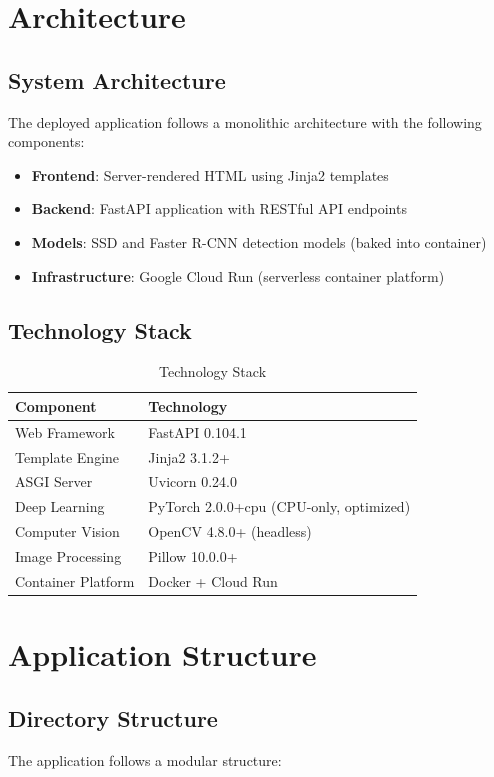 \documentclass[12pt,a4paper]{article}
\begin{document}
\section{Architecture}

\subsection{System Architecture}
The deployed application follows a monolithic architecture with the following components:

\begin{itemize}
    \item \textbf{Frontend}: Server-rendered HTML using Jinja2 templates
    \item \textbf{Backend}: FastAPI application with RESTful API endpoints
    \item \textbf{Models}: SSD and Faster R-CNN detection models (baked into container)
    \item \textbf{Infrastructure}: Google Cloud Run (serverless container platform)
\end{itemize}

\subsection{Technology Stack}
\begin{table}[H]
\centering
\begin{tabular}{ll}
\toprule
\textbf{Component} & \textbf{Technology} \\
\midrule
Web Framework & FastAPI 0.104.1 \\
Template Engine & Jinja2 3.1.2+ \\
ASGI Server & Uvicorn 0.24.0 \\
Deep Learning & PyTorch 2.0.0+cpu (CPU-only, optimized) \\
Computer Vision & OpenCV 4.8.0+ (headless) \\
Image Processing & Pillow 10.0.0+ \\
Container Platform & Docker + Cloud Run \\
\bottomrule
\end{tabular}
\caption{Technology Stack}
\end{table}

\section{Application Structure}

\subsection{Directory Structure}
The application follows a modular structure:
\end{document}
